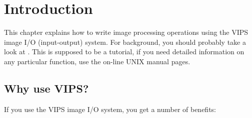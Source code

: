 \section{Introduction}

This chapter explains how to write image processing operations using the
VIPS image I/O (input-output) system. For background, you should probably
take a look at . This is supposed to be a tutorial, if you
need detailed information on any particular function, use the on-line UNIX
manual pages.

\subsection{Why use VIPS?}

If you use the VIPS image I/O system, you get a number of benefits:

